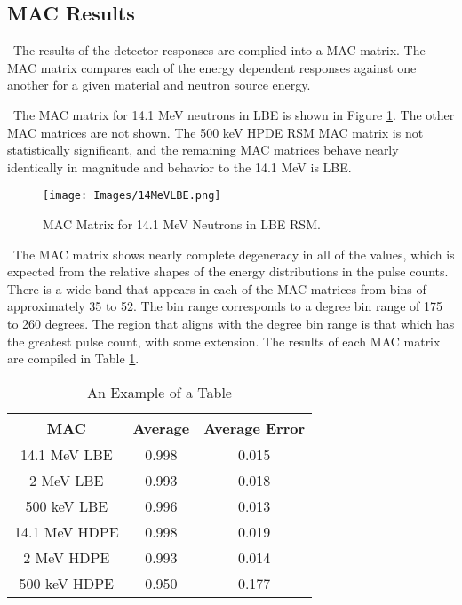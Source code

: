 \documentclass[journal]{IEEEtran}
\let\MYoriglatexcaption\caption
\renewcommand{\caption}[2][\relax]{\MYoriglatexcaption[#2]{#2}}
\begin{document}
	\subsection{MAC Results}
	
	\ The results of the detector responses are complied into a MAC matrix. The MAC matrix compares each of the energy dependent responses against one another for a given material and neutron source energy.  
	
    \ The MAC matrix for 14.1 MeV neutrons in LBE is shown in Figure \ref{fig:MACFig}. The other MAC matrices are not shown.  The 500 keV HPDE RSM MAC matrix is not statistically significant, and the remaining MAC matrices behave nearly identically in magnitude and behavior to the 14.1 MeV is LBE. 
	
	\begin{figure}[h]
		\texttt{[image: Images/14MeVLBE.png]}
		\centering
		\caption{MAC Matrix for 14.1 MeV Neutrons in LBE RSM.}
		\label{fig:MACFig}
	\end{figure}	
	
	\ The MAC matrix shows nearly complete degeneracy in all of the values, which is expected from the relative shapes of the energy distributions in the pulse counts.  There is a wide band that appears in each of the MAC matrices from bins of approximately 35 to 52.  The bin range corresponds to a degree bin range of 175 to 260 degrees.  The region that aligns with the degree bin range is that which has the greatest pulse count, with some extension.  The results of each MAC matrix are compiled in Table \ref{table_example}.  

    \begin{table}[h]
	\renewcommand{\arraystretch}{1.3}
	\caption{An Example of a Table}
	\label{table_example}
	\centering
	\begin{tabular}{|c||c||c|}
	\hline
	MAC & Average & Average Error\\
    \hline
    14.1 MeV LBE & 0.998 & 0.015\\
    \hline
    2 MeV LBE & 0.993 & 0.018\\
    \hline
    500 keV LBE & 0.996 & 0.013\\
    \hline
    14.1 MeV HDPE & 0.998 & 0.019\\
    \hline
    2 MeV HDPE & 0.993 & 0.014\\
    \hline
    500 keV HDPE & 0.950 & 0.177\\
    \hline
	\end{tabular}
	\end{table}
\end{document}
